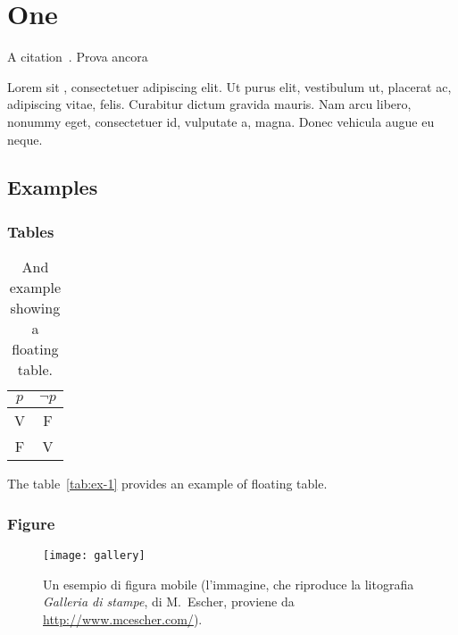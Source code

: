 
\chapter{One}
\label{cap:one}

A citation~\citep{gihman1973}. Prova ancora~\citep{gihman1974}

Lorem   sit , consectetuer adipiscing elit. Ut purus elit, vestibulum ut, placerat ac, adipiscing vitae, felis. Curabitur dictum gravida mauris. Nam arcu libero, nonummy eget, consectetuer id, vulputate a, magna. Donec vehicula augue eu neque.

\section{Examples}

\subsection{Tables}

\lipsum

\begin{table}[tb]
\caption[A floating table]{And example showing a floating table.}
\label{tab:ex-1}
\centering
\begin{tabular}{cc}
\toprule
$p$ & $\lnot p$ \\ 
\midrule
V   & F \\ 
F   & V \\
\bottomrule 
\end{tabular}
\end{table}

The table~\vref{tab:ex-1} provides an example of floating table.

\lipsum[1-2]

\subsection{Figure}

\lipsum[2]

\begin{figure}[tb] 
\centering 
\texttt{[image: gallery]} 
\caption[Un esempio di figura mobile]{Un esempio di figura mobile (l'immagine, che riproduce la litografia \emph{Galleria di stampe}, di M.~Escher, proviene da \url{http://www.mcescher.com/}).}
\label{fig:galleria} 
\end{figure}

